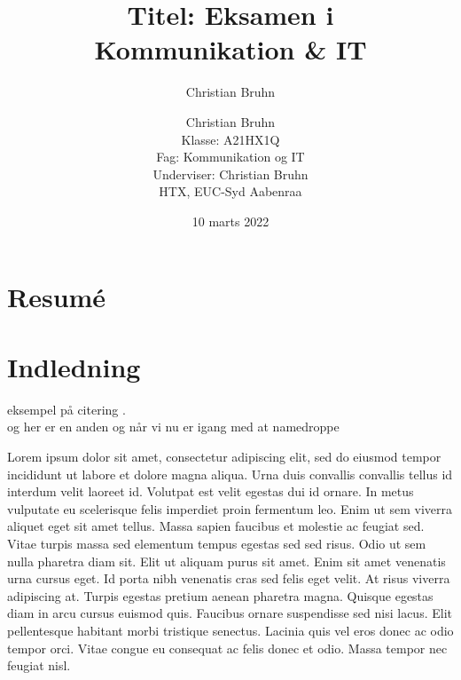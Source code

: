 \documentclass[12pt,a4paper]{article}
\author{Christian Bruhn}
\begin{document}
\begin{titlepage}


\title{Titel: Eksamen i \\ Kommunikation \& IT} 
\date{10 marts 2022}

\author{Christian Bruhn  \\
	Klasse: A21HX1Q				\\
	Fag: Kommunikation og IT \\
	Underviser: Christian Bruhn \\
	HTX, EUC-Syd Aabenraa
	}
 
\maketitle
\thispagestyle{empty}
\end{titlepage}




\newpage
\thispagestyle{empty}
\section*{Resumé}
\newpage
\thispagestyle{empty}
\renewcommand*{\contentsname}{Indholdsfortegnelse}
\tableofcontents

\newpage
\setcounter{page}{1}
\section{Indledning}
eksempel på citering \cite{um-k}.\\
og her er en anden \cite{granovetter1973strength} og når vi nu er igang med at namedroppe \cite{einstein}



Lorem ipsum dolor sit amet, consectetur adipiscing elit, sed do eiusmod tempor incididunt ut labore et dolore magna aliqua. Urna duis convallis convallis tellus id interdum velit laoreet id. Volutpat est velit egestas dui id ornare. In metus vulputate eu scelerisque felis imperdiet proin fermentum leo. Enim ut sem viverra aliquet eget sit amet tellus. Massa sapien faucibus et molestie ac feugiat sed. Vitae turpis massa sed elementum tempus egestas sed sed risus. Odio ut sem nulla pharetra diam sit. Elit ut aliquam purus sit amet. Enim sit amet venenatis urna cursus eget. Id porta nibh venenatis cras sed felis eget velit. At risus viverra adipiscing at. Turpis egestas pretium aenean pharetra magna. Quisque egestas diam in arcu cursus euismod quis. Faucibus ornare suspendisse sed nisi lacus. Elit pellentesque habitant morbi tristique senectus. Lacinia quis vel eros donec ac odio tempor orci. Vitae congue eu consequat ac felis donec et odio. Massa tempor nec feugiat nisl.
\end{document}
